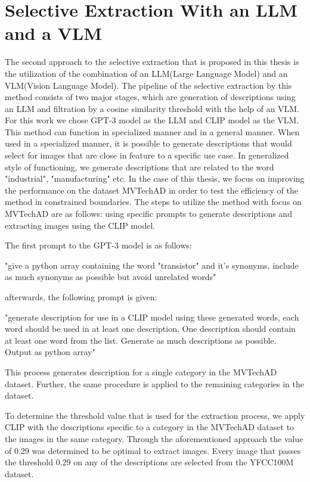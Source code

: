 \section{Selective Extraction With an LLM and a VLM}
\label{llm and vlm extraction}
The second approach to the selective extraction that is proposed in this thesis is the utilization of the combination of an LLM(Large Language Model) and an VLM(Vision Language Model). The pipeline of the selective extraction by this method consists of two major stages, which are generation of descriptions using an LLM and filtration by a cosine similarity threshold with the help of an VLM. For this work we chose GPT-3 model as the LLM and CLIP model as the VLM. This method can function in specialized manner and in a general manner. When used in a specialized manner, it is possible to generate descriptions that would select for images that are close in feature to a specific use case. In generalized style of functioning, we generate descriptions that are related to the word "industrial", "manufacturing" etc. In the case of this thesis, we focus on improving the performance on the dataset MVTechAD in order to test the efficiency of the method in constrained boundaries. The steps to utilize the method with focus on MVTechAD are as follows: using specific prompts to generate descriptions and extracting images using the CLIP model.

The first prompt to the GPT-3 model is as follows:

"give a python array containing the word "transistor" and it's synonyms, include as much synonyms as possible but avoid unrelated words"

afterwards, the following prompt is given:

"generate description for use in a CLIP model using these generated words, each word should be used in at least one description. One description should contain at least one word from the list. Generate as much descriptions as possible. Output as python array"

This process generates description for a single category in the MVTechAD dataset. Further, the same procedure is applied to the remaining categories in the dataset.

To determine the threshold value that is used for the extraction process, we apply CLIP with the descriptions specific to a category in the MVTechAD dataset to the images in the same category. Through the aforementioned approach the value of 0.29 was determined to be optimal to extract images. Every image that passes the threshold 0.29 on any of the descriptions are selected from the YFCC100M dataset. 

